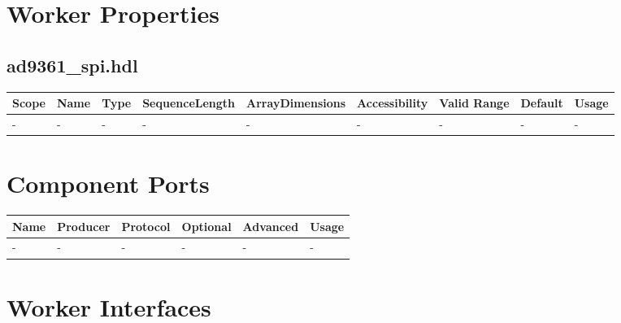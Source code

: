 \documentclass{article}
\def\comp{ad9361\_spi}
\begin{document}
\begin{landscape}
	\section*{Worker Properties}
	\subsection*{\comp.hdl}
	\begin{scriptsize}
		\begin{tabular}{|p{2cm}|p{2cm}|p{1cm}|p{2cm}|p{2cm}|p{2cm}|p{2cm}|p{1cm}|p{4.58cm}|}
			\hline
			\rowcolor{blue}
			Scope        & Name                 & Type & SequenceLength & ArrayDimensions & Accessibility & Valid Range        & Default & Usage                                                                                                                  \\
			\hline
			- & - & - & - & - & - & - & - & - \\
			\hline
		\end{tabular}
	\end{scriptsize}

	\section*{Component Ports}
	\begin{scriptsize}
		\begin{tabular}{|p{2cm}|p{1.5cm}|p{4cm}|p{1.5cm}|p{1.5cm}|p{9.38cm}|}
			\hline
			\rowcolor{blue}
			Name & Producer & Protocol           & Optional & Advanced & Usage                  \\
			\hline
			-  & -     & - & -     & -        & - \\
			\hline
		\end{tabular}
	\end{scriptsize}
	\section*{Worker Interfaces}

\end{landscape}
\end{document}
